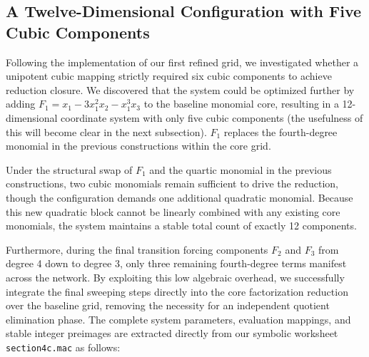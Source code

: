 \documentclass[11pt,a4paper]{article}
\begin{document}
\subsection{A Twelve-Dimensional Configuration with Five Cubic Components}
\label{subsec:cubic_12d_five}

Following the implementation of our first refined grid, we investigated whether a unipotent cubic mapping strictly required six cubic components to achieve reduction closure. We discovered that the system could be optimized further by adding $F_1 = 
x_1 - 3x_1^2x_2 - x_1^3x_3$ to the baseline monomial core, resulting in a 12-dimensional coordinate system with only five cubic components (the usefulness of this will become clear in the next subsection). $F_1$ replaces the fourth-degree monomial in the previous constructions within the core grid. 

Under the structural swap of $F_1$ and the quartic monomial in the previous constructions, two cubic monomials remain sufficient to drive the reduction, though the configuration demands one additional quadratic monomial. Because this new quadratic block cannot be linearly combined with any existing core monomials, the system maintains a stable total count of exactly 12 components. 

Furthermore, during the final transition forcing components $F_2$ and $F_3$ from degree 4 down to degree 3, only three remaining fourth-degree terms manifest across the network. By exploiting this low algebraic overhead, we successfully integrate the final sweeping steps directly into the core factorization reduction over the baseline grid, removing the necessity for an independent quotient elimination phase. The complete system parameters, evaluation mappings, and stable integer preimages are extracted directly from our symbolic worksheet \texttt{section4c.mac} as follows:
\end{document}
